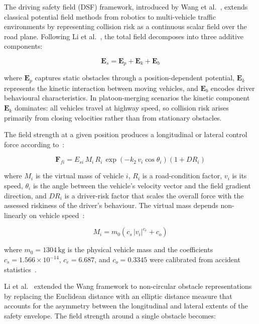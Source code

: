 \documentclass[12pt,a4paper,oneside]{report}
\begin{document}
The driving safety field (DSF) framework, introduced by Wang et al.~\cite{wangDrivingSafetyField2015, wangDrivingSafetyField2016}, extends classical potential field methods from robotics to multi-vehicle traffic environments by representing collision risk as a continuous scalar field over the road plane. Following Li et al.~\cite{liSharedControlNovel2019}, the total field decomposes into three additive components:

\begin{equation}
\mathbf{E}_s = \mathbf{E}_p + \mathbf{E}_k + \mathbf{E}_b
\label{eq:total_safety_field}
\end{equation}

where $\mathbf{E}_p$ captures static obstacles through a position-dependent potential, $\mathbf{E}_k$ represents the kinetic interaction between moving vehicles, and $\mathbf{E}_b$ encodes driver behavioural characteristics. In platoon-merging scenarios the kinetic component $\mathbf{E}_k$ dominates: all vehicles travel at highway speed, so collision risk arises primarily from closing velocities rather than from stationary obstacles.

The field strength at a given position produces a longitudinal or lateral control force according to~\cite{wangDrivingSafetyField2016}:

\begin{equation}
\mathbf{F}_{fi} = E_{si} \, M_i \, R_i \, \exp\!\left(-k_2 \, v_i \cos\theta_i\right)\left(1 + DR_i\right)
\label{eq:field_force}
\end{equation}

where $M_i$ is the virtual mass of vehicle $i$, $R_i$ is a road-condition factor, $v_i$ is its speed, $\theta_i$ is the angle between the vehicle's velocity vector and the field gradient direction, and $DR_i$ is a driver-risk factor that scales the overall force with the assessed riskiness of the driver's behaviour. The virtual mass depends non-linearly on vehicle speed~\cite{wangDrivingSafetyField2016}:

\begin{equation}
M_i = m_0 \left( c_s \, |v_i|^{c_e} + c_o \right)
\label{eq:virtual_mass}
\end{equation}

where $m_0 = 1304\,\mathrm{kg}$ is the physical vehicle mass and the coefficients $c_s = 1.566 \times 10^{-14}$, $c_e = 6.687$, and $c_o = 0.3345$ were calibrated from accident statistics~\cite{wangDrivingSafetyField2016}.

Li et al.~\cite{liSharedControlNovel2019} extended the Wang framework to non-circular obstacle representations by replacing the Euclidean distance with an elliptic distance measure that accounts for the asymmetry between the longitudinal and lateral extents of the safety envelope. The field strength around a single obstacle becomes:
\end{document}
